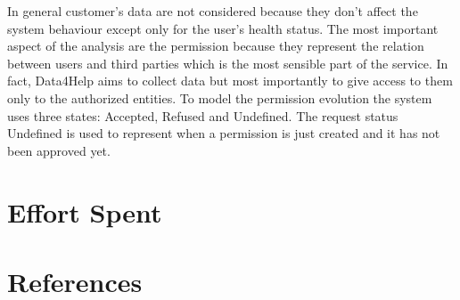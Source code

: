 \documentclass[a4paper]{article}
\begin{document}
    In general customer's data are not considered because they don't affect the system behaviour except only for the user's health status. \newline The most important aspect of the analysis are the permission because they represent the relation between users and third parties which is the most sensible part of the service. \newline In fact, Data4Help aims to collect data but most importantly to give access to them only to the authorized entities. \newline
    To model the permission evolution the system uses three states: Accepted, Refused and Undefined. \newline
    The request status Undefined is used to represent when a permission is just created and it has not been approved yet.



    
    \section{Effort Spent}
    
    \section{References}
    
    
    
\end{document}
